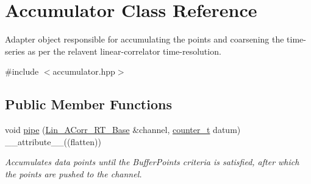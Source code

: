 \hypertarget{classAccumulator}{}\section{Accumulator Class Reference}
\label{classAccumulator}


Adapter object responsible for accumulating the points and coarsening the time-\/series as per the relavent linear-\/correlator time-\/resolution.  




{\ttfamily \#include $<$accumulator.\+hpp$>$}

\subsection*{Public Member Functions}
\begin{DoxyCompactItemize}
\item 
void \hyperlink{classAccumulator_aa1793bc1599bc2451fabc44954673164}{pipe} (\hyperlink{classLin__ACorr__RT__Base}{Lin\+\_\+\+A\+Corr\+\_\+\+R\+T\+\_\+\+Base} \&channel, \hyperlink{types_8hpp_a22f279793847eba127de149437848c48}{counter\+\_\+t} datum) \+\_\+\+\_\+attribute\+\_\+\+\_\+((flatten))
\begin{DoxyCompactList}\small\item\em Accumulates data points until the Buffer\+Points criteria is satisfied, after which the points are pushed to the channel. \end{DoxyCompactList}\end{DoxyCompactItemize}
